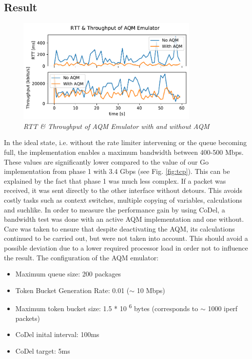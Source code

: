 \subsection{Result}
\begin{figure}[htbp]
\centering
\includegraphics*[width=9cm]{iperf3_aqm_and_noaqm}
\caption{\em RTT \& Throughput of AQM Emulator with and without AQM}
\label{fig:aqm_on_off_comparison}
\end{figure}
In the ideal state, i.e. without the rate limiter intervening or the queue becoming full, the implementation enables a maximum bandwidth between 400-500 Mbps.\newline
These values are significantly lower compared to the value of our Go implementation from phase 1 with 3.4 Gbps (see Fig. \ref{fig:tcp}). This can be explained by the fact that phase 1 was much less complex. If a packet was received, it was sent directly to the other interface without detours. This avoids costly tasks such as context switches, multiple copying of variables, calculations and suchlike. \newline
In order to measure the performance gain by using CoDel, a bandwidth test was done with an active AQM implementation and one without. Care was taken to ensure that despite deactivating the AQM, its calculations continued to be carried out, but were not taken into account. This should avoid a possible deviation due to a lower required processor load in order not to influence the result.\newline
The configuration of the AQM emulator:
\begin{itemize}
  \item Maximum queue size: 200 packages
  \item Token Bucket Generation Rate: 0.01 ($\sim$ 10 Mbps)
  \item Maximum token bucket size: 1.5 * 10 \textsuperscript{6} bytes (corresponds to $\sim$ 1000 iperf packets)
  \item CoDel inital interval: 100ms
  \item CoDel target: 5ms
\end{itemize}

